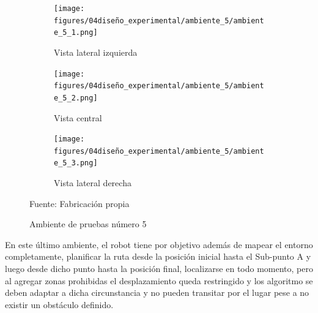\begin{figure}[H]
    \centering
    \begin{subfigure}[b]{0.30\textwidth}
    \texttt{[image: figures/04diseño\_experimental/ambiente\_5/ambiente\_5\_1.png]}
    \caption{Vista lateral izquierda}
    \label{fig:ambiente_5_1}
    \end{subfigure}
    \begin{subfigure}[b]{0.30\textwidth}
    \texttt{[image: figures/04diseño\_experimental/ambiente\_5/ambiente\_5\_2.png]}
    \caption{Vista central}
    \label{fig:ambiente_5_2}
    \end{subfigure}
    \begin{subfigure}[b]{0.30\textwidth}
    \texttt{[image: figures/04diseño\_experimental/ambiente\_5/ambiente\_5\_3.png]}
    \caption{Vista lateral derecha}
    \label{fig:ambiente_5_3}
    \end{subfigure}
    \caption{Ambiente de pruebas número 5 }
    Fuente: Fabricación propia
    \label{fig:ambiente_5}
\end{figure}

En este último ambiente, el robot tiene por objetivo además de mapear el entorno completamente, planificar la ruta desde la posición inicial hasta el Sub-punto A y luego desde dicho punto hasta la posición final, localizarse en todo momento, pero al agregar zonas prohibidas el desplazamiento queda restringido y los algoritmo se deben adaptar a dicha circunstancia y no pueden transitar por el lugar pese a no existir un obstáculo definido.


